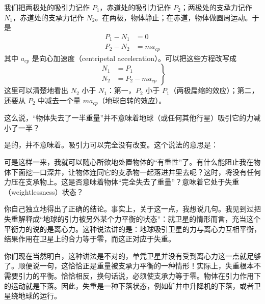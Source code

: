 \begin{dialogue}
我们把两极处的吸引力记作 $P_{1}$，赤道处的吸引力记作 $P_{2}$；两极处的支承力记作 $N_{1}$，赤道处的支承力记作 $N_{2}$。在两极，物体静止；在赤道，物体做圆周运动。于是
\begin{equation*}%
\begin{split}
P_{1} - N_{1} & =0\\
P_{2} - N_{2}& =ma_{cp}
\end{split}
\end{equation*}
其中 $a_{cp}$ 是向心加速度（centripetal acceleration）。可以把这些方程改写成
\begin{equation}%
\left.
\begin{split}
N_{1} & = P_{1} \\
N_{2} & = P_{2} - ma_{cp}
\label{eq-46}
\end{split}
\right\}
\end{equation}
这里可以清楚地看出 $N_{2}$ 小于 $N_{1}$：第一，$P_{2}$ 小于 $P_{1}$（两极扁缩的效应）；第二，还要从 $P_{2}$ 中减去一个量 $ma_{cp}$（地球自转的效应）。

\stdb 这么说，“物体失去了一半重量”并不意味着地球（或任何其他行星）吸引它的力减小了一半？

\tchr 是的，并不意味着。吸引力可以完全没有改变。这个说法的意思是：

\stdb 可是这样一来，我就可以随心所欲地处置物体的“有重性”了。有什么能阻止我在物体下面挖一口深井，让物体连同它的支承物一起落进井里去呢？这时，将没有任何力压在支承物上。这是否意味着物体“完全失去了重量”？意味着它处于失重（weightlessness）状态？

\tchr 你自己独立地得出了正确的结论。事实上，关于这一点，我想说几句。我见到过把失重解释成“地球的引力被另外某个力平衡的状态”：就卫星的情形而言，充当这个平衡力的说的是离心力。这种说法讲的是：地球吸引卫星的力与离心力互相平衡，结果作用在卫星上的合力等于零，而这正对应于失重。

你们现在当然明白，这种讲法是不对的，单凭卫星并没有受到离心力这一点就足够了。顺便说一句，这恰恰正是重量被支承力平衡的一种情形！实际上，失重根本不需要引力的平衡。恰恰相反，换句话说，必须使支承力等于零。物体在引力作用下的运动就是下落。因此，失重是一种下落状态，例如矿井中升降机的下落，或者卫星绕地球的运行。


\end{dialogue}
